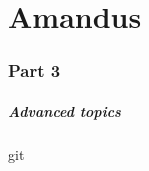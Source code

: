 \part{Amandus}

\section*{Part 3}
\begin{frame}
  \frametitle{Advanced topics}
  \tableofcontents[hideallsubsections]
  
  \vfill

  \hyperlink{part1}{}
  \hyperlink{part2}{}
  \hypertarget{part3}{}
\end{frame}

%
 {git}


% 
% 


